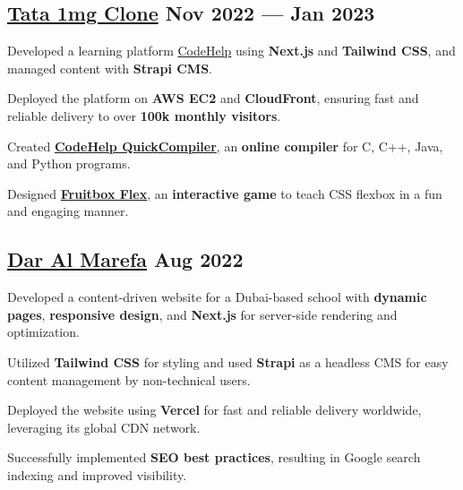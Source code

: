 \subsection{{\href{https://www.thecodehelp.in}{Tata 1mg Clone} \hfill Nov 2022 --- Jan 2023}}
\begin{zitemize}
\item Developed a learning platform \href{https://www.thecodehelp.in}{CodeHelp} using \textbf{Next.js} and \textbf{Tailwind CSS}, and managed content with \textbf{Strapi CMS}.
\item Deployed the platform on \textbf{AWS EC2} and \textbf{CloudFront}, ensuring fast and reliable delivery to over \textbf{100k monthly visitors}.
\item Created \href{https://labs.thecodehelp.in/quick-compiler}{\textbf{CodeHelp QuickCompiler}}, an \textbf{online compiler} for C, C++, Java, and Python programs.
\item Designed \href{https://labs.thecodehelp.in/fruitbox-flex}{\textbf{Fruitbox Flex}}, an \textbf{interactive game} to teach CSS flexbox in a fun and engaging manner.
\end{zitemize}

\subsection{{\href{https://www.daralmarefa.ae}{Dar Al Marefa} \hfill Aug 2022}}
\begin{zitemize}
\item Developed a content-driven website for a Dubai-based school with \textbf{dynamic pages}, \textbf{responsive design}, and \textbf{Next.js} for server-side rendering and optimization.
\item Utilized \textbf{Tailwind CSS} for styling and used \textbf{Strapi} as a headless CMS for easy content management by non-technical users.
\item Deployed the website using \textbf{Vercel} for fast and reliable delivery worldwide, leveraging its global CDN network.
\item Successfully implemented \textbf{SEO best practices}, resulting in Google search indexing and improved visibility.
\end{zitemize}

